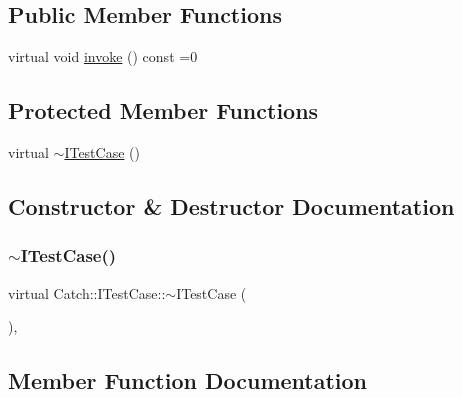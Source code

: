 \subsection*{Public Member Functions}
\begin{DoxyCompactItemize}
\item 
virtual void \hyperlink{struct_catch_1_1_i_test_case_a678825e62e7c17297621cfeb65588c34}{invoke} () const =0
\end{DoxyCompactItemize}
\subsection*{Protected Member Functions}
\begin{DoxyCompactItemize}
\item 
virtual \hyperlink{struct_catch_1_1_i_test_case_add7b9bec455ac1b007c17df82144310e}{$\sim$\+I\+Test\+Case} ()
\end{DoxyCompactItemize}


\subsection{Constructor \& Destructor Documentation}
\hypertarget{struct_catch_1_1_i_test_case_add7b9bec455ac1b007c17df82144310e}{}\label{struct_catch_1_1_i_test_case_add7b9bec455ac1b007c17df82144310e} 
\subsubsection{\texorpdfstring{$\sim$\+I\+Test\+Case()}{~ITestCase()}}
{\footnotesize\ttfamily virtual Catch\+::\+I\+Test\+Case\+::$\sim$\+I\+Test\+Case (\begin{DoxyParamCaption}{ }\end{DoxyParamCaption})\hspace{0.3cm}{\ttfamily [protected]}, {\ttfamily [virtual]}}



\subsection{Member Function Documentation}
\hypertarget{struct_catch_1_1_i_test_case_a678825e62e7c17297621cfeb65588c34}{}\label{struct_catch_1_1_i_test_case_a678825e62e7c17297621cfeb65588c34} 
